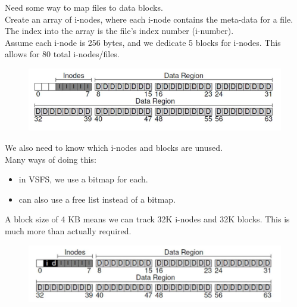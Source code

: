 \documentclass[12pt]{article}
\theoremstyle{plain}
\theoremstyle{definition}
\begin{document}
Need some way to map files to data blocks. \\

Create an array of i-nodes, where each i-node contains the meta-data for a file. \\
The index into the array is the file's index number (i-number). \\

Assume each i-node is 256 bytes, and we dedicate 5 blocks for i-nodes.
This allows for 80 total i-nodes/files.

\begin{figure}[H]
  \centering
  \includegraphics[scale=0.8]{pictures/vsfs_2.png}
\end{figure}

We also need to know which i-nodes and blocks are unused. \\
Many ways of doing this:
\begin{itemize}
  \item in VSFS, we use a bitmap for each.
  \item can also use a free list instead of a bitmap.
\end{itemize}

A block size of 4 KB means we can track 32K i-nodes and 32K blocks.
This is much more than actually required.
\begin{figure}[H]
  \centering
  \includegraphics[scale=0.8]{pictures/vsfs_3.png}
\end{figure}
\end{document}
